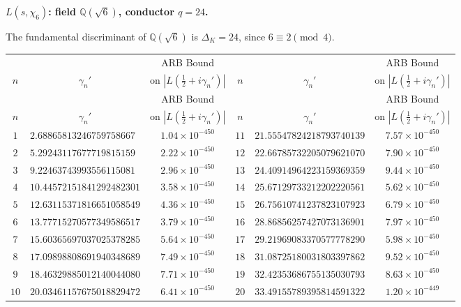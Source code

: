 \documentclass[12pt,reqno]{amsart}
\theoremstyle{plain}
\theoremstyle{definition}
\theoremstyle{remark}
\newcommand{\Q}{\mathbb{Q}}
\begin{document}
\medskip\noindent\textbf{$L(s,\chi_6)$: field $\Q(\sqrt{6})$, conductor $q=24$.}\par\smallskip
\label{app:chi24-zeros}

The fundamental discriminant of $\Q(\sqrt{6})$ is $\Delta_K = 24$, since $6 \equiv 2 \pmod{4}$.

\renewcommand{\arraystretch}{1.05}\footnotesize
\begin{longtable}{clc|clc}
\toprule
 & & \multicolumn{1}{c}{ARB Bound} &
 & & \multicolumn{1}{c}{ARB Bound} \\
$n$ & \multicolumn{1}{c}{$\gamma_n'$} & \multicolumn{1}{c}{on $|L(\tfrac{1}{2}+i\gamma_n')|$} &
$n$ & \multicolumn{1}{c}{$\gamma_n'$} & \multicolumn{1}{c}{on $|L(\tfrac{1}{2}+i\gamma_n')|$} \\
\midrule
\endfirsthead
\toprule
 & & \multicolumn{1}{c}{ARB Bound} &
 & & \multicolumn{1}{c}{ARB Bound} \\
$n$ & \multicolumn{1}{c}{$\gamma_n'$} & \multicolumn{1}{c}{on $|L(\tfrac{1}{2}+i\gamma_n')|$} &
$n$ & \multicolumn{1}{c}{$\gamma_n'$} & \multicolumn{1}{c}{on $|L(\tfrac{1}{2}+i\gamma_n')|$} \\
\midrule
\endhead
\bottomrule
\endlastfoot
$1$ & $2.68865813246759758667$ & $1.04 \times 10^{-450}$ & $11$ & $21.55547824218793740139$ & $7.57 \times 10^{-450}$ \\
$2$ & $5.29243117677719815159$ & $2.22 \times 10^{-450}$ & $12$ & $22.66785732205079621070$ & $7.90 \times 10^{-450}$ \\
$3$ & $9.22463743993556115081$ & $2.96 \times 10^{-450}$ & $13$ & $24.40914964223159369359$ & $9.44 \times 10^{-450}$ \\
$4$ & $10.44572151841292482301$ & $3.58 \times 10^{-450}$ & $14$ & $25.67129733212202220561$ & $5.62 \times 10^{-450}$ \\
$5$ & $12.63115371816651058549$ & $4.36 \times 10^{-450}$ & $15$ & $26.75610741237823107923$ & $6.79 \times 10^{-450}$ \\
$6$ & $13.77715270577349586517$ & $3.79 \times 10^{-450}$ & $16$ & $28.86856257427073136901$ & $7.97 \times 10^{-450}$ \\
$7$ & $15.60365697037025378285$ & $5.64 \times 10^{-450}$ & $17$ & $29.21969083370577778290$ & $5.98 \times 10^{-450}$ \\
$8$ & $17.09898808691940348689$ & $7.49 \times 10^{-450}$ & $18$ & $31.08725180031803397862$ & $9.52 \times 10^{-450}$ \\
$9$ & $18.46329885012140044080$ & $7.71 \times 10^{-450}$ & $19$ & $32.42353686755135030793$ & $8.63 \times 10^{-450}$ \\
$10$ & $20.03461157675018829472$ & $6.41 \times 10^{-450}$ & $20$ & $33.49155789395814591322$ & $1.20 \times 10^{-449}$ \\

\end{longtable}
\normalsize
\end{document}
